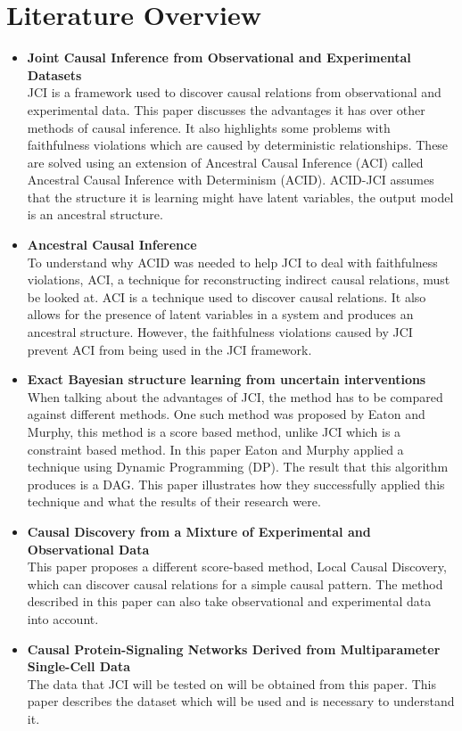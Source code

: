 \documentclass[11pt]{article}
\begin{document}
\section{Literature Overview}
\begin{itemize}
    \item \textbf{Joint Causal Inference from Observational and Experimental Datasets}\\
    JCI is a framework used to discover causal relations from observational and experimental data. This paper discusses the advantages it has over other methods of causal inference. It also highlights some problems with faithfulness violations which are caused by deterministic relationships. These are solved using an extension of Ancestral Causal Inference (ACI) called Ancestral Causal Inference with Determinism (ACID). ACID-JCI assumes that the structure it is learning might have latent variables, the output model is an ancestral structure.\cite{jci}
    
    \item \textbf{Ancestral Causal Inference}\\
    To understand why ACID was needed to help JCI to deal with faithfulness violations, ACI, a technique for reconstructing indirect causal relations, must be looked at. ACI is a technique used to discover causal relations. It also allows for the presence of latent variables in a system and produces an ancestral structure. However, the faithfulness violations caused by JCI prevent ACI from being used in the JCI framework. \cite{aci}
    
    \item \textbf{Exact Bayesian structure learning from uncertain interventions}\\
    When talking about the advantages of JCI, the method has to be compared against different methods. One such method was proposed by Eaton and Murphy, this method is a score based method, unlike JCI which is a constraint based method. In this paper Eaton and Murphy applied a technique using Dynamic Programming (DP). The result that this algorithm produces is a DAG. This paper illustrates how they successfully applied this technique and what the results of their research were. \cite{eaton2007exact}
    
    \item \textbf{Causal Discovery from a Mixture of Experimental and Observational Data}\\
    This paper proposes a different score-based method, Local Causal Discovery, which can discover causal relations for a simple causal pattern. The method described in this paper can also take observational and experimental data into account. \cite{cooper1999causal}
    
    \item \textbf{Causal Protein-Signaling Networks Derived from Multiparameter Single-Cell Data}\\
    The data that JCI will be tested on will be obtained from this paper. This paper describes the dataset which will be used and is necessary to understand it. \cite{sachs2005causal}
\end{itemize}
\end{document}
